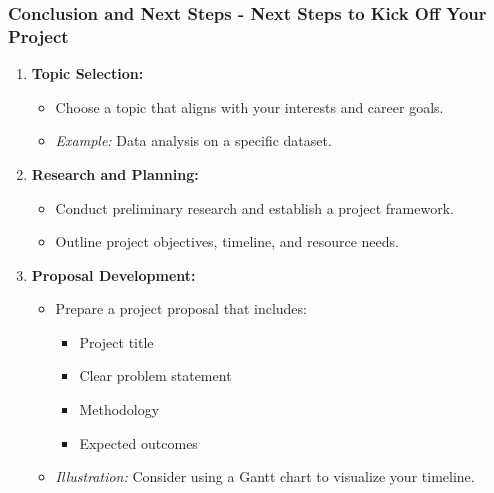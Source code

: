 \documentclass[aspectratio=169]{beamer}
\begin{document}
\begin{frame}[fragile]
    \frametitle{Conclusion and Next Steps - Next Steps to Kick Off Your Project}
    \begin{enumerate}
        \item \textbf{Topic Selection:} 
            \begin{itemize}
                \item Choose a topic that aligns with your interests and career goals.
                \item \textit{Example:} Data analysis on a specific dataset.
            \end{itemize}
        \item \textbf{Research and Planning:} 
            \begin{itemize}
                \item Conduct preliminary research and establish a project framework.
                \item Outline project objectives, timeline, and resource needs.
            \end{itemize}
        \item \textbf{Proposal Development:} 
            \begin{itemize}
                \item Prepare a project proposal that includes:
                    \begin{itemize}
                        \item Project title
                        \item Clear problem statement
                        \item Methodology
                        \item Expected outcomes
                    \end{itemize}
                \item \textit{Illustration:} Consider using a Gantt chart to visualize your timeline.
            \end{itemize}
    \end{enumerate}
\end{frame}
\end{document}
